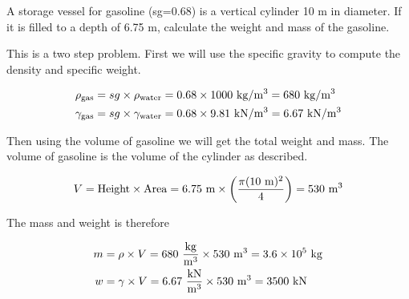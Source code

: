 \documentclass[12pt]{article}
\begin{document}
\begin{question}
A storage vessel for gasoline (sg=0.68) is a vertical cylinder 10 m in diameter.  If it is filled to a depth of 6.75 m, calculate the weight and mass of the gasoline.

\begin{solution}
  This is a two step problem.  First we will use the specific gravity to compute the density and specific weight.

  \begin{align*}
    \rho_{\rm gas}&=sg\times \rho_{\rm water}=0.68\times 1000~\mathrm{kg}/\mathrm{m}^3=680~\mathrm{kg}/\mathrm{m}^3\\
    \gamma_{\rm gas}&=sg\times \gamma_{\rm water}=0.68\times 9.81~\mathrm{kN}/\mathrm{m}^3=6.67~\mathrm{kN}/\mathrm{m}^3
  \end{align*}

  Then using the volume of gasoline we will get the total weight and mass.  The volume of gasoline is the volume of the cylinder as described.

  \begin{align*}
      V={\rm Height}\times {\rm Area}=6.75~\mathrm{m}\times \left(\frac{\pi (10~\mathrm{m})^2}{4}\right)=530~\mathrm{m}^3
  \end{align*}

  The mass and weight is therefore

  \begin{align*}
      m&=\rho\times V=680~\frac{\mathrm{kg}}{\mathrm{m}^3}\times 530~\mathrm{m}^3 = 3.6\times 10^{5}~\mathrm{kg}\\
      w&=\gamma\times V=6.67~\frac{\mathrm{kN}}{\mathrm{m}^3}\times 530~\mathrm{m}^3 = 3500~\mathrm{kN}
  \end{align*}

\end{solution}

\end{question}
\end{document}
